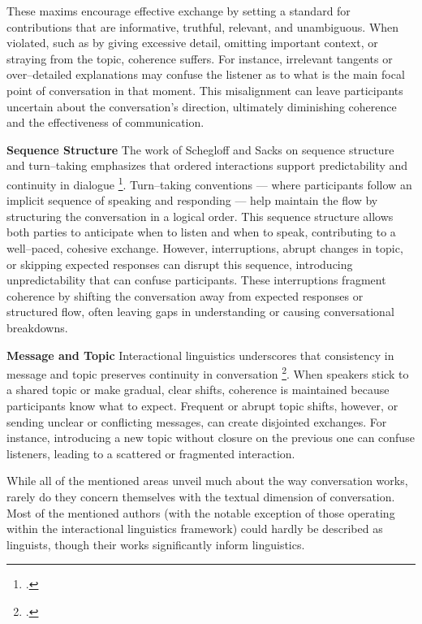 \documentclass[12pt]{report}
\begin{document}
{These maxims encourage effective exchange by setting a standard for contributions that are informative, truthful, relevant, and unambiguous. When violated, such as by giving excessive detail, omitting important context, or straying from the topic, coherence suffers. For instance, irrelevant tangents or over–detailed explanations may confuse the listener as to what is the main focal point of conversation in that moment. This misalignment can leave participants uncertain about the conversation’s direction, ultimately diminishing coherence and the effectiveness of communication.

\par{\textbf{Sequence Structure}}
The work of Schegloff and Sacks on sequence structure and turn–taking emphasizes that ordered interactions support predictability and continuity in dialogue \footcite{Schegloff_2007}. Turn–taking conventions — where participants follow an implicit sequence of speaking and responding — help maintain the flow by structuring the conversation in a logical order. This sequence structure allows both parties to anticipate when to listen and when to speak, contributing to a well–paced, cohesive exchange. However, interruptions, abrupt changes in topic, or skipping expected responses can disrupt this sequence, introducing unpredictability that can confuse participants. These interruptions fragment coherence by shifting the conversation away from expected responses or structured flow, often leaving gaps in understanding or causing conversational breakdowns.

\par{\textbf{Message and Topic}}
Interactional linguistics underscores that consistency in message and topic preserves continuity in conversation
\footcite{CouperKuhlenSelting2017}.
When speakers stick to a shared topic or make gradual, clear shifts, coherence is
maintained because participants know what to expect.
Frequent or abrupt topic shifts, however, or sending unclear or conflicting messages, can create disjointed exchanges.
For instance, introducing a new topic without closure on the previous one can confuse listeners,
leading to a scattered or fragmented interaction.

\par
While all of the mentioned areas unveil much about the way conversation works,
rarely do they concern themselves with the textual dimension of conversation.
Most of the mentioned authors (with the notable exception of those operating within the interactional linguistics framework) could hardly be described as linguists,
though their works significantly inform linguistics.

}
\end{document}
